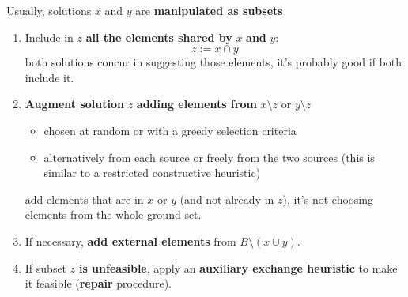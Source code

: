 Usually, solutions $x$ and $y$ are \textbf{manipulated as subsets}
\begin{enumerate}
	\item Include in $z$ \textbf{all the elements shared by} $x$ \textbf{and} $y$:
	$$ z := x \cap y $$
	both solutions concur in suggesting those elements, it's probably good if both include it.\\
	
	\item \textbf{Augment solution} $z$ \textbf{adding elements from} $x \setminus z$ or $y \setminus z$
	\begin{itemize}
		\item chosen at random or with a greedy selection criteria
		\item alternatively from each source or freely from the two sources (this is similar to a restricted constructive heuristic)
	\end{itemize}
	add elements that are in $x$ or $y$ (and not already in $z$), it's not choosing elements from the whole ground set.\\
	
	\item If necessary, \textbf{add external elements} from $B \setminus (x \cup y)$.\\
	
	\item If subset $z$ \textbf{is unfeasible}, apply an \textbf{auxiliary exchange heuristic} to make it feasible (\textbf{repair} procedure).\\
\end{enumerate}

\newpage

